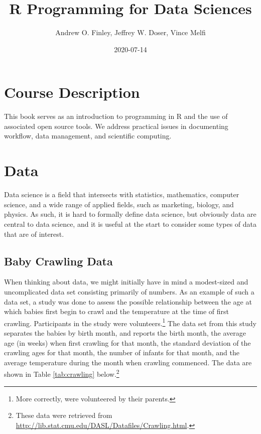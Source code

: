 \documentclass[
]{krantz}
\title{R Programming for Data Sciences}
\author{Andrew O. Finley, Jeffrey W. Doser, Vince Melfi}
\date{2020-07-14}
\begin{document}
\maketitle


\thispagestyle{empty}

\setlength{\abovedisplayskip}{-5pt}
\setlength{\abovedisplayshortskip}{-5pt}

{
\hypersetup{linkcolor=}
\setcounter{tocdepth}{2}
\tableofcontents
}
\listoftables
\listoffigures
\hypertarget{course-description}{%
\chapter*{Course Description}\label{course-description}}


This book serves as an introduction to programming in R and the use of associated open source tools. We address practical issues in documenting workflow, data management, and scientific computing.

\mainmatter

\hypertarget{data}{%
\chapter{Data}\label{data}}

Data science is a field that intersects with statistics, mathematics, computer science, and a wide range of applied fields, such as marketing, biology, and physics. As such, it is hard to formally define data science, but obviously data are central to data science, and it is useful at the start to consider some types of data that are of interest.

\hypertarget{baby-crawling-data}{%
\section{Baby Crawling Data}\label{baby-crawling-data}}

When thinking about data, we might initially have in mind a modest-sized and uncomplicated data set consisting primarily of numbers. As an example of such a data set, a study was done to assess the possible relationship between the age at which babies first begin to crawl and the temperature at the time of first crawling. Participants in the study were volunteers.\footnote{More correctly, were volunteered by their parents.} The data set from this study separates the babies by birth month, and reports the birth month, the average age (in weeks) when first crawling for that month, the standard deviation of the crawling ages for that month, the number of infants for that month, and the average temperature during the month when crawling commenced. The data are shown in Table \ref{tab:crawling} below.\footnote{These data were retrieved from \url{http://lib.stat.cmu.edu/DASL/Datafiles/Crawling.html}.}
\end{document}
